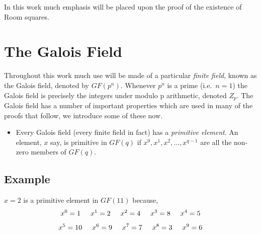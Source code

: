 \documentclass[
  12pt,
  a4paper]{book}
\providecommand{\tightlist}{%
  \setlength{\itemsep}{0pt}\setlength{\parskip}{0pt}}
\begin{document}
In this work much emphasis will be placed upon the proof of the
existence of Room squares.

\hypertarget{the-galois-field}{%
\section{The Galois Field}\label{the-galois-field}}

Throughout this work much use will be made of a particular \emph{finite
field}, known as the Galois field, denoted by \(GF(p^n)\). Whenever
\(p^n\) is a prime (i.e.~\(n=1\)) the Galois field is precisely the
integers under modulo p arithmetic, denoted \(Z_p\). The Galois field
has a number of important properties which are used in many of the
proofs that follow, we introduce some of these now.

\begin{itemize}
\tightlist
\item
  Every Galois field (every finite field in fact) has a \emph{primitive
  element}. An element, \(x\) say, is primitive in \(GF(q)\) if
  \(x^0,x^1,x^2,...,x^{q-1}\) are all the non-zero members of \(GF(q)\).
\end{itemize}

\hypertarget{example}{%
\subsection{Example}\label{example}}

\(x=2\) is a primitive element in \(GF(11)\) because,
\[x^0 = 1 \hspace{0.5cm} x^1 = 2 \hspace{0.5cm} x^2 = 4 \hspace{0.5cm} x^3 = 8 \hspace{0.5cm} x^4 = 5\]
\[x^5 = 10 \hspace{0.5cm} x^6 = 9 \hspace{0.5cm} x^7 = 7 \hspace{0.5cm} x^8 = 3 \hspace{0.5cm} x^9 = 6\]
\end{document}
